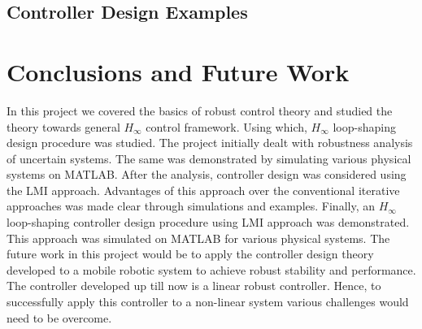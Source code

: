 \documentclass[a4paper,12pt]{article}
\begin{document}
	 \subsection{Controller Design Examples}	 
\section{Conclusions and Future Work}
In this project we covered the basics of robust control theory and studied the theory towards general $H_{\infty}$ control framework. Using which, $H_{\infty}$ loop-shaping design procedure was studied. The project initially dealt with robustness analysis of uncertain systems. The same was demonstrated by simulating various physical systems on MATLAB. After the analysis, controller design was considered using the LMI approach. Advantages of this approach over the conventional iterative approaches was made clear through simulations and examples. Finally, an $H_{\infty}$ loop-shaping controller design procedure using LMI approach was demonstrated. This approach was simulated on MATLAB for various physical systems. The future work in this project would be to apply the controller design theory developed to a mobile robotic system to achieve robust stability and performance. The controller developed up till now is a linear robust controller. Hence, to successfully apply this controller to a non-linear system various challenges would need to be overcome.
\printbibliography 
\end{document}
